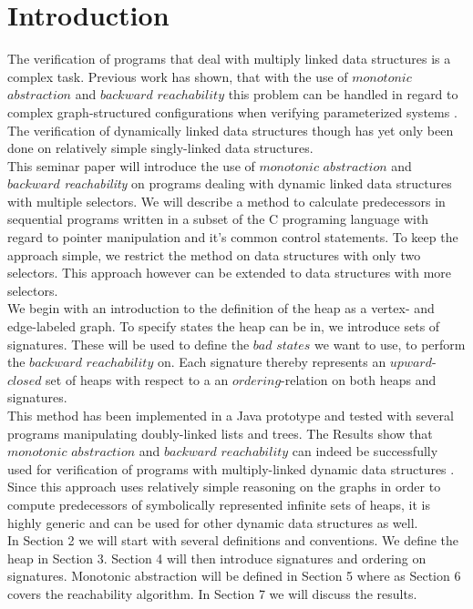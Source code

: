 \newpage
\section{Introduction}
\label{sec:introduction}

The verification of programs that deal with multiply linked data structures is a complex task. Previous work has shown,
that with the use of $monotonic$ $abstraction$ and $backward$ $reachability$ this problem can be handled in regard to
complex graph-structured configurations when verifying parameterized systems \cite{abdulla2009automated, abdulla2008monotonic, abdulla2008handling}. The verification of dynamically linked data structures though has yet only been done on relatively simple
singly-linked data structures.\\
This seminar paper will introduce the use of $monotonic$ $abstraction$ and $backward$ \textit{reachability} on programs dealing with 
dynamic linked data structures with multiple selectors. We will describe a method to calculate predecessors in sequential 
programs written in a subset of the C programing language with regard to pointer manipulation and it's common control statements.
To keep the approach simple, we restrict the method on data structures with only two selectors. This approach however can be extended
to data structures with more selectors.\\
We begin with an introduction to the definition of the heap as a vertex- and edge-labeled graph. 
To specify states the heap can be in, we introduce sets of signatures. These will be used to define the $bad$ $states$ we want
to use, to perform the $backward$ $reachability$ on. Each signature thereby represents an $upward$-$closed$ set of heaps with respect
to a an $ordering$-relation on both heaps and signatures.\\
This method has been implemented in a Java prototype and tested with several programs manipulating doubly-linked lists and trees.
The Results show that $monotonic$ $abstraction$ and $backward$ $reachability$ can indeed be successfully used for verification of 
programs with multiply-linked dynamic data structures \cite{abdulla2009automated}.\\
Since this approach uses relatively simple reasoning on the graphs in order to compute predecessors of symbolically represented infinite
sets of heaps, it is highly generic and can be used for other dynamic data structures as well.\\
In Section 2 we will start with several definitions and conventions. We define the heap in Section 3. 
Section 4 will then introduce signatures and ordering on signatures. Monotonic abstraction will be defined in Section 5 where as 
Section 6 covers the reachability algorithm. In Section 7 we will discuss the results.
\begin{comment}
Begin your paper with an introduction into your topic.
\subsection{hallo}
tschuess.
\end{comment}
